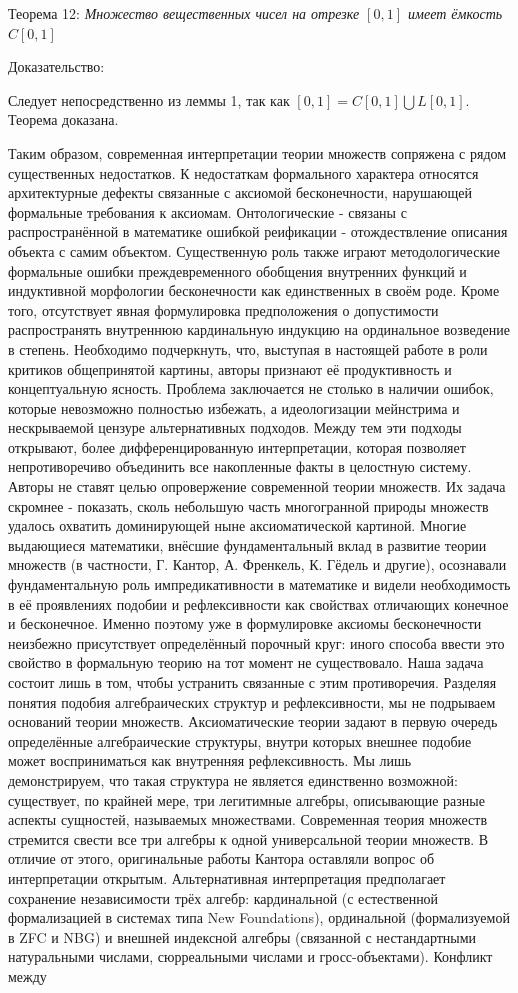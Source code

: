\documentclass[12pt]{article}
\begin{document}
Теорема 12: {\sl Множество вещественных чисел на отрезке $[0, 1]$ имеет ёмкость $C[0, 1]$}

Доказательство:

Следует непосредственно из леммы 1, так как $[0, 1] = C[0, 1] \bigcup L[0, 1]$. Теорема доказана. 

Таким образом, современная интерпретации теории множеств сопряжена с рядом существенных недостатков. К недостаткам формального характера относятся архитектурные дефекты связанные с аксиомой бесконечности, нарушающей формальные требования к аксиомам. Онтологические - связаны с распространённой в математике ошибкой реификации - отождествление описания объекта с самим объектом. Существенную роль также играют методологические формальные ошибки преждевременного обобщения внутренних функций и индуктивной морфологии бесконечности как единственных в своём роде. Кроме того, отсутствует явная формулировка предположения о допустимости распространять внутреннюю кардинальную индукцию на ординальное возведение в степень. Необходимо подчеркнуть, что, выступая в настоящей работе в роли критиков общепринятой картины, авторы признают её продуктивность и концептуальную ясность. Проблема заключается не столько в наличии ошибок, которые невозможно полностью избежать, а идеологизации мейнстрима и нескрываемой цензуре альтернативных подходов. Между тем эти подходы открывают, более дифференцированную интерпретации, которая позволяет непротиворечиво объединить все накопленные факты в целостную систему. Авторы не ставят целью опровержение современной теории множеств. Их задача скромнее - показать, сколь небольшую часть многогранной природы множеств удалось охватить доминирующей ныне аксиоматической картиной. Многие выдающиеся математики, внёсшие фундаментальный вклад в развитие теории множеств (в частности, Г. Кантор, А. Френкель, К. Гёдель и другие), осознавали фундаментальную роль импредикативности в математике и видели необходимость в её проявлениях подобии и рефлексивности как свойствах отличающих конечное и бесконечное. Именно поэтому уже в формулировке аксиомы бесконечности неизбежно присутствует определённый порочный круг: иного способа ввести это свойство в формальную теорию на тот момент не существовало. Наша задача состоит лишь в том, чтобы устранить связанные с этим противоречия. Разделяя понятия подобия алгебраических структур и рефлексивности, мы не подрываем оснований теории множеств. Аксиоматические теории задают в первую очередь определённые алгебраические структуры, внутри которых внешнее подобие может восприниматься как внутренняя рефлексивность. Мы лишь демонстрируем, что такая структура не является единственно возможной: существует, по крайней мере, три легитимные алгебры, описывающие разные аспекты сущностей, называемых множествами. Современная теория множеств стремится свести все три алгебры к одной универсальной теории множеств. В отличие от этого, оригинальные работы Кантора оставляли вопрос об интерпретации открытым. Альтернативная интерпретация предполагает сохранение независимости трёх алгебр: кардинальной (с естественной формализацией в системах типа New Foundations), ординальной (формализуемой в ZFC и NBG) и внешней индексной алгебры (связанной с нестандартными натуральными числами, сюрреальными числами и гросс-объектами). Конфликт между 
\end{document}
